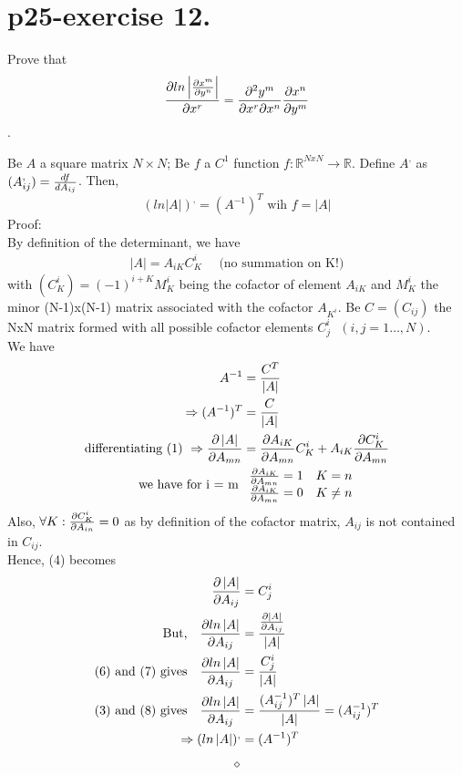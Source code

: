 \section{p25-exercise 12.}
\begin{tcolorbox}
Prove that $$\pdv{ln\left|\pdv{x^m}{y^n}\right|}{x^r} =\pdv{y^m}{x^r}{x^n}\pdv{x^n}{y^m}$$.
\end{tcolorbox}
\begin{lemma}
Be $A$ a square matrix $N\times N$; Be $f$ a $C^1$ function $f:\mathbb{R}^{NxN} \rightarrow \mathbb{R}$. Define $A^{,}$ as $(A^,_{ij}) = \dv{f}{A_{ij}}$. Then,$$(ln\left|A\right|)^, = (A^{-1})^T \text{ wih }  f =\left|A\right|$$
Proof:\\
By definition of the determinant, we have
\begin{align}
\left|A\right| = A_{iK}C_{K}^i \quad \text{ (no summation on K!)}
\end{align}
with $(C_{K}^i) =  (-1)^{i+K}M^{i}_K$ being the cofactor  of element $A_{iK}$ and $M^{i}_K$ the minor (N-1)x(N-1) matrix associated with the cofactor $A_{K^i}$. Be $C = (C_{ij})$ the NxN matrix formed with all possible cofactor elements  $C_{j}^i \text{  }(i,j = 1 \dots,N)$.\\
We have 
\begin{align}
\ A^{-1} &= \frac{C^T}{\left|A\right|}\\
\Rightarrow (A^{-1})^T &= \frac{C}{\left|A\right|} \\
\text{differentiating (1) }\Rightarrow \pdv{\left|A\right|}{A_{mn}} &= \pdv{A_{iK}}{A_{mn}}C^i_K +A_{iK} \pdv{C^i_K}{A_{mn}}\\
\text{we have for i = m } & \begin{array}{c}
    \pdv{A_{iK}}{A_{mn}} = 1\quad K=n\\
    \pdv{A_{iK}}{A_{mn}} = 0\quad K \neq n\\
  \end{array}
\end{align}
Also, $\forall K: \pdv{C^i_K}{A_{in}} = 0 $ as by definition of the cofactor matrix, $A_{ij} $ is not contained in $C_{ij} $.\\
Hence, (4) becomes
\begin{align}
\pdv{\left|A\right|}{A_{ij}} &= C^i_j\\
\text{But,}\quad \pdv{ln\left|A\right|}{A_{ij}} &= \frac{\pdv{\left|A\right|}{A_{ij}}}{\left|A\right|}\\
\text{(6) and  (7) gives}\quad \pdv{ln\left|A\right|}{A_{ij}} &= \frac{C^i_j}{\left|A\right|}\\
\text{(3) and  (8) gives}\quad \pdv{ln\left|A\right|}{A_{ij}} &= \frac{(A^{-1}_{ij})^T \left|A\right|}{\left|A\right|} = (A^{-1}_{ij})^T \\
\Rightarrow (ln\left|A\right|)^, &= (A^{-1})^T
\end{align}
\end{lemma}$$\diamond$$

